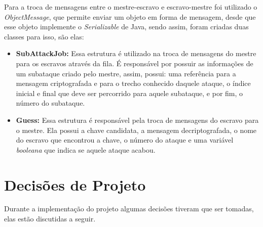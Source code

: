 \documentclass[
	12pt,				%
    oneside,			%
	a4paper,			%
	english,			%
	brazil,				%
	]{abntex2}
\begin{document}
Para a troca de mensagens entre o mestre-escravo e escravo-mestre foi utilizado o \textit{ObjectMessage}, que permite enviar um objeto em forma de mensagem, desde que esse objeto implemente o \textit{Serializable} de Java, sendo assim, foram criadas duas classes para isso, são elas:

\begin{itemize}

	\item \textbf{SubAttackJob:} Essa estrutura é utilizado na troca de mensagens do mestre para os escravos através da fila.
	É responsável por possuir as informações de um subataque criado pelo mestre, assim, possui: uma referência para a
	mensagem criptografada e para o trecho conhecido daquele ataque, o índice inicial e final que deve ser percorrido para
	aquele subataque, e por fim, o número do subataque.
		
	\item \textbf{Guess:} Essa estrutura é responsável pela troca de mensagens do escravo para o mestre.
	Ela possui a chave candidata, a mensagem decriptografada, o nome do escravo que encontrou a chave, o número do ataque e 
	uma variável \textit{booleana} que indica se aquele ataque acabou.
		
\end{itemize}

\section{Decisões de Projeto}
Durante a implementação do projeto algumas decisões tiveram que ser tomadas, elas estão discutidas a seguir.
\end{document}
